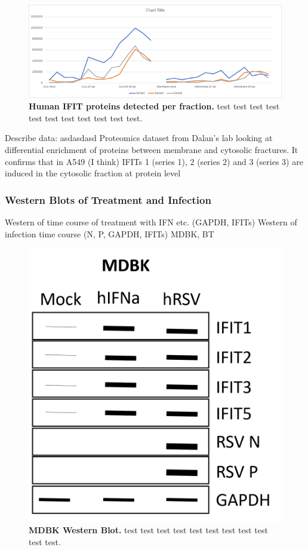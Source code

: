 \begin{figure}
    \centering
    \includegraphics[width=1\linewidth]{06. Chapter 1/Figs/02. Expression/04. proteomics.png}
    \caption[Human IFIT proteins detected per fraction.]{\textbf{Human IFIT proteins detected per fraction.} test test test test test test test test test test test.}
    \label{Human IFIT proteins detected per fraction.}
\end{figure}

Describe data: \newline
asdasdasd \newline
Proteomics dataset from Dalan’s lab looking at differential enrichment of proteins between membrane and cytosolic fractures. It confirms that in A549 (I think) IFITs 1 (series 1), 2 (series 2) and 3 (series 3) are induced in the cytosolic fraction at protein level 







\subsubsection{Western Blots of Treatment and Infection} \label{Western Blots of Treatment and Infection}
Western of time course of treatment with IFN etc. (GAPDH, IFITs) \newline
Western of infection time course (N, P, GAPDH, IFITs) \newline
MDBK, BT

\begin{figure}
    \centering
    \includegraphics[width=0.5\linewidth]{07. Chapter 2/Figs/03. Expression/02. mdbk wb.png}
    \caption[MDBK Western Blot.]{\textbf{MDBK Western Blot.} test test test test test test test test test test test.}
    \label{MDBK Western Blot.}
\end{figure}


